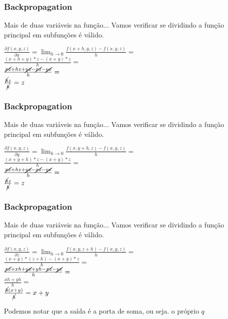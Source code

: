 \documentclass{beamer}
\begin{document}
\begin{frame}
	\frametitle{Backpropagation}
	\begin{block}{Mais de duas variáveis na função...}
		Vamos verificar se dividindo a função principal em subfunções é válido.
	\end{block}
	\begin{example}
		\renewcommand{\CancelColor}{\color{red}}
		$\frac{\partial f(x,y, z)}{\partial x} = \lim_{h \rightarrow 0 }\frac{f(x+h, y,z) - f(x,y,z)}{h} = $ \\ 
		
		$ \frac{(x+h + y)*z - (x + y)*z}{h} = $ \\ $\frac{\cancel{xz}+hz + \cancel{yz} - \cancel{xz} - \cancel{yz}}{h} = $ \\ $\frac{\cancel{h}z}{\cancel{h}} = z $
	\end{example}
\end{frame}
\begin{frame}
	\frametitle{Backpropagation}
	\begin{block}{Mais de duas variáveis na função...}
		Vamos verificar se dividindo a função principal em subfunções é válido.
	\end{block}
	\begin{example}
		\renewcommand{\CancelColor}{\color{red}}
		$\frac{\partial f(x,y, z)}{\partial y} = \lim_{h \rightarrow 0 }\frac{f(x, y+h,z) - f(x,y,z)}{h} = $ \\ 
		
		$ \frac{(x + y + h)*z - (x + y)*z}{h} = $ \\ $\frac{\cancel{xz}+hz + \cancel{yz} - \cancel{xz} - \cancel{yz}}{h} = $ \\ $\frac{\cancel{h}z}{\cancel{h}} = z $
	\end{example}
\end{frame}
\begin{frame}
	\frametitle{Backpropagation}
	\begin{block}{Mais de duas variáveis na função...}
		Vamos verificar se dividindo a função principal em subfunções é válido.
	\end{block}
	\begin{example}
		\renewcommand{\CancelColor}{\color{red}}
		$\frac{\partial f(x,y, z)}{\partial z} = \lim_{h \rightarrow 0 }\frac{f(x, y,z+h) - f(x,y,z)}{h} = $ \\ 
		
		$ \frac{(x + y)*(z + h) - (x + y)*z}{h} = $ \\ $\frac{\cancel{xz}+xh + \cancel{yz} + yh - \cancel{xz} - \cancel{yz}}{h} = $ \\ $\frac{xh + yh}{h} =  $\\ $\frac{\cancel{h}(x + y)}{\cancel{h}} = x + y $
		
		Podemos notar que a saída é a porta de soma, ou seja. o próprio $q$
	\end{example}
\end{frame}
\end{document}
